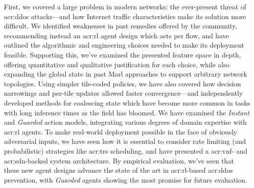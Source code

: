 First, we covered a large problem in modern networks: the ever-present threat of \gls{acr:ddos} attacks---and how Internet traffic characteristics make its solution more difficult.
We identified weaknesses in past remedies offered by the community, recommending instead an \gls{acr:rl} agent design which acts per flow, and have outlined the algorithmic and engineering choices needed to make its deployment feasible.
Supporting this, we've examined the presented feature space in depth, offering quantitative and qualitative justification for each choice, while also expanding the global state in past Marl approaches to support arbitrary network topologies.
Using simpler tile-coded policies, we have also covered how decision narrowings and per-tile updates allowed faster convergence---and independently developed methods for coalescing state which have become more common in tasks with long inference times as the field has bloomed.
We have examined the \emph{Instant} and \emph{Guarded} action models, integrating various degrees of domain expertise with \gls{acr:rl} agents.
To make real-world deployment possible in the face of obviously adversarial inputs, we have seen how it is essential to consider rate limiting (and probabilistic) strategies like \gls{acr:trs} scheduling, and have presented a \gls{acr:vnf}- and \gls{acr:sdn}-backed system architecture.
By empirical evaluation, we've seen that these new agent designs advance the state of the art in \gls{acr:rl}-based \gls{acr:ddos} prevention, with \emph{Guarded} agents showing the most promise for future evaluation.


